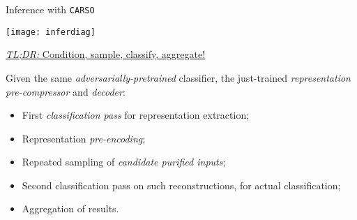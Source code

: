 \begin{frame}{ Inference with \texttt{CARSO}}
    \begin{minipage}[]{0.5\textwidth}
        \vspace{0px}
        \texttt{[image: inferdiag]}
    \end{minipage}
    \begin{minipage}[]{0.45\textwidth}
\vspace{0pt}

\begin{center}
    \underline{\textit{TL;DR:} Condition, sample, classify, aggregate!}
\end{center}

Given the same \textit{adversarially-pretrained} classifier, the just-trained \textit{representation pre-compressor} and \textit{decoder}:
\hfill\break
\begin{itemize}
    \item First \textit{classification pass} for representation \alert{extraction};
    \item Representation \textit{pre-encoding};
    \item \alert{Repeated sampling} of \textit{candidate purified inputs};
    \item Second classification pass on such reconstructions, for \alert{actual classification};
    \item \alert{Aggregation} of results.
\end{itemize}
\end{minipage}
\end{frame}
